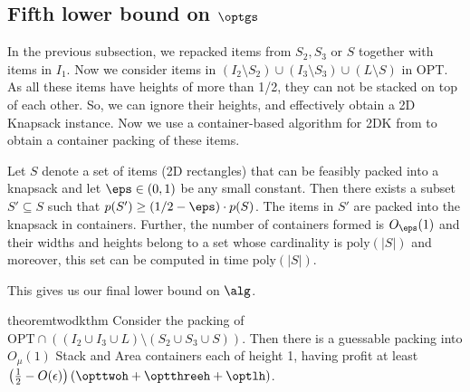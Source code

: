 \subsection{Fifth lower bound on \texorpdfstring{$\optgs$}{optgs}}
\label{sec:fifthlb}
In the previous subsection, we repacked items from $S_2, S_3$ or $S$ together with items in $I_1$. 
Now we consider items in $(I_2\setminus S_2)\cup (I_3\setminus S_3)\cup (L\setminus S)$ in OPT. As all these items have heights of more than 1/2, they can not be stacked on top of each other. So, we can ignore their heights, and effectively obtain a 2D Knapsack instance. 
Now we use a container-based algorithm for 2DK from \cite{khan2021approximation} to obtain a container packing of these items. 

\begin{theorem} 
\label{thm:cont2dk}
Let $S$ denote a set of items (2D rectangles) that can be feasibly packed into a knapsack and let $\eps \in (0,1)$ be any small constant.
Then there exists a subset $S' \subseteq S$ such that $p(S') \ge (1/2-\eps) \cdot p(S)$. The items in $S'$ are packed into the knapsack in containers. Further, the number of containers formed is $O_{\eps}(1)$ and their widths and heights belong to a set whose cardinality is $\text{poly}(|S|)$ and
moreover, this set can be computed in time $\text{poly}(|S|)$.
\end{theorem}

This gives us our final lower bound on $\alg$.


\begin{restatable}{theorem}{twodkthm}%
\label{thm:2dknapsack}
    Consider the packing of $\text{OPT}\cap ((I_2\cup I_3\cup L)\setminus (S_2\cup S_3\cup S))$. Then there is a guessable \container packing into $O_{\mu}(1)$ Stack and Area containers each of height 1, having profit at least $\left(\frac{1}{2}-O(\epsilon)\right)(\opttwoh+\optthreeh+\optlh)$.
\end{restatable}



